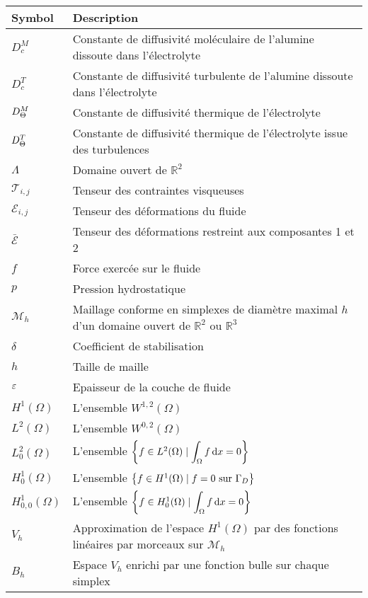 \begin{tabularx}{\textwidth}{@{}lX@{}}
  \toprule
  Symbol & Description \\
  \midrule
  $D_c^M$ & Constante de diffusivité moléculaire de l'alumine dissoute dans l'électrolyte\\
  $D_c^T$ & Constante de diffusivité turbulente de l'alumine dissoute dans l'électrolyte\\
  $D_\Theta^M$ & Constante de diffusivité thermique de l'électrolyte\\
  $D_\Theta^T$ & Constante de diffusivité thermique de l'électrolyte issue des turbulences\\
  $\Lambda$ & Domaine ouvert de $\mathbb R^2$\\
  $\mathcal T_{i,j}$ & Tenseur des contraintes visqueuses \\
  $\mathcal E_{i,j}$ & Tenseur des déformations du fluide \\
  $\bar{\mathcal E}$ & Tenseur des déformations restreint aux composantes 1 et 2 \\
  $f$ & Force exercée sur le fluide \\
  $p$ & Pression hydrostatique \\
  $\mathcal M_h$ & Maillage conforme en simplexes de diamètre maximal $h$ d'un domaine ouvert de $\mathbb R^2$ ou $\mathbb R^3$\\
  $\delta$ & Coefficient de stabilisation \\
  $h$ & Taille de maille \\
  $\varepsilon$ & Epaisseur de la couche de fluide \\
  $H^1(\Omega)$ & L'ensemble $W^{1, 2}(\Omega)$\\
  $L^2(\Omega)$ & L'ensemble $W^{0, 2}(\Omega)$\\
  $L^2_0(\Omega)$ & L'ensemble $\left\{ f \in L^2(\Omega) \mid \displaystyle\int_\Omega f\,\mathrm dx = 0 \right\}$\\
  $H^1_0(\Omega)$ & L'ensemble $\left\{ f \in H^1(\Omega) \mid f = 0 \text{ sur } \Gamma_D \right\}$\\
  $H^1_{0,0}(\Omega)$ & L'ensemble $\left\{ f \in H^1_0(\Omega) \mid \displaystyle\int_\Omega f\,\mathrm dx = 0 \right\}$\\
  $V_h$ & Approximation de l'espace $H^1(\Omega)$ par des fonctions
  linéaires par morceaux sur $\mathcal M_h$\\
  $B_h$ & Espace $V_h$ enrichi par une fonction bulle sur chaque simplex\\
  \bottomrule
\end{tabularx}

